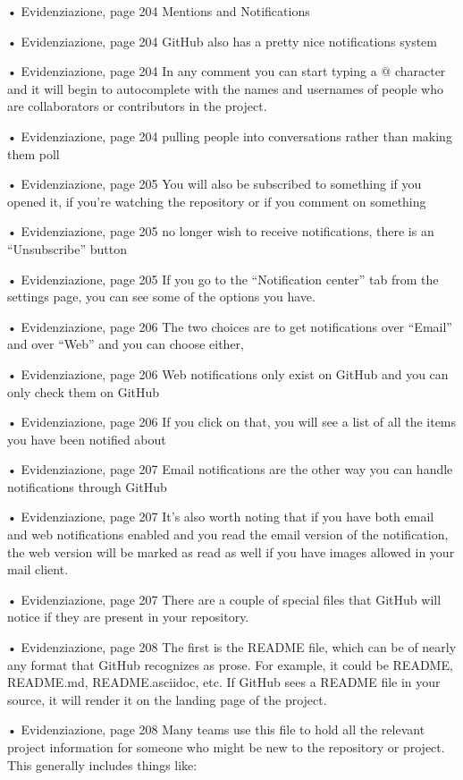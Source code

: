 • Evidenziazione, page 204
Mentions and Notifications

• Evidenziazione, page 204
GitHub also has a pretty nice notifications system

• Evidenziazione, page 204
In any comment you can start typing a @ character and it will begin to autocomplete with the names and usernames of people who are collaborators or contributors in the project.

• Evidenziazione, page 204
pulling people into conversations rather than making them poll

• Evidenziazione, page 205
You will also be subscribed to something if you opened it, if you’re watching the repository or if you comment on something

• Evidenziazione, page 205
no longer wish to receive notifications, there is an “Unsubscribe” button

• Evidenziazione, page 205
If you go to the “Notification center” tab from the settings page, you can see some of the options you have.

• Evidenziazione, page 206
The two choices are to get notifications over “Email” and over “Web” and you can choose either,

• Evidenziazione, page 206
Web notifications only exist on GitHub and you can only check them on GitHub

• Evidenziazione, page 206
If you click on that, you will see a list of all the items you have been notified about

• Evidenziazione, page 207
Email notifications are the other way you can handle notifications through GitHub

• Evidenziazione, page 207
It’s also worth noting that if you have both email and web notifications enabled and you read the email version of the notification, the web version will be marked as read as well if you have images allowed in your mail client.

• Evidenziazione, page 207
There are a couple of special files that GitHub will notice if they are present in your repository.

• Evidenziazione, page 208
The first is the README file, which can be of nearly any format that GitHub recognizes as prose. For example, it could be README, README.md, README.asciidoc, etc. If GitHub sees a README file in your source, it will render it on the landing page of the project.

• Evidenziazione, page 208
Many teams use this file to hold all the relevant project information for someone who might be new to the repository or project. This generally includes things like:

